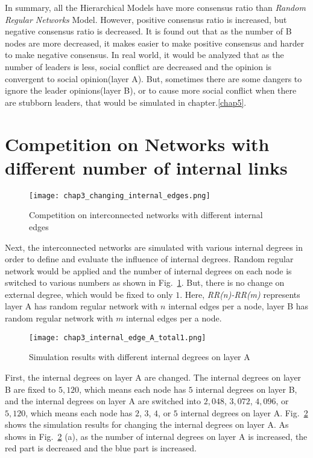 In summary, all the Hierarchical Models have more consensus ratio than \textit{Random Regular Networks} Model. However, positive consensus ratio is increased, but negative consensus ratio is decreased. It is found out that as the number of B nodes are more decreased, it makes easier to make positive consensus and harder to make negative consensus. In real world, it would be analyzed that as the number of leaders is less, social conflict are decreased and the opinion is convergent to social opinion(layer A). But, sometimes there are some dangers to ignore the leader opinions(layer B), or to cause more social conflict when there are stubborn leaders, that would be simulated in chapter.\ref{chap5}. 

\section{Competition on Networks with different number of internal links}
\begin{figure}[!htb]
	\centering
	\texttt{[image: chap3\_changing\_internal\_edges.png]}
	\caption{Competition on interconnected networks with different internal edges}
	\label{chap3_changing_internal_edges}
\end{figure}
Next, the interconnected networks are simulated with various internal degrees in order to define and evaluate the influence of internal degrees. Random regular network would be applied and the number of internal degrees on each node is switched to various numbers as shown in Fig.~\ref{chap3_changing_internal_edges}. But, there is no change on external degree, which would be fixed to only $1$. Here, \textit{RR(n)-RR(m)} represents layer A has random regular network with $n$ internal edges per a node, layer B has random regular network with $m$ internal edges per a node.
\begin{figure}[!htb]
	\centering
	\texttt{[image: chap3\_internal\_edge\_A\_total1.png]}
	\caption{Simulation results with different internal degrees on layer A}
	\label{chap3_internal_edge_A_total}
\end{figure}
First, the internal degrees on layer A are changed. The internal degrees on layer B are fixed to $5,120$, which means each node has $5$ internal degrees on layer B, and the internal degrees on layer A are switched into $2,048$, $3,072$, $4,096$, or $5,120$, which means each node has $2$, $3$, $4$, or $5$ internal degrees on layer A. Fig.~\ref{chap3_internal_edge_A_total} shows the simulation results for changing the internal degrees on layer A. As shows in Fig.~\ref{chap3_internal_edge_A_total} (a), as the number of internal degrees on layer A is increased, the red part is decreased and the blue part is increased.  


